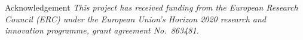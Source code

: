\documentclass[final]{beamer}
\newlength{\sepwidth}
\newlength{\colwidth}
\newcommand{\separatorcolumn}{\begin{column}{\sepwidth}\end{column}}
\begin{document}
\begin{frame}[t]
\begin{columns}[t]
\begin{column}{\colwidth}
\end{column}

\separatorcolumn
\end{columns}

\vspace{-1.5cm}
\begin{block}{Acknowledgement}
  \centering
  \textit{This project has received funding from the European Research Council (ERC) under the European Union's Horizon 2020 research and innovation programme, grant agreement No.~863481.}
\end{block}

\end{frame}
\end{document}
